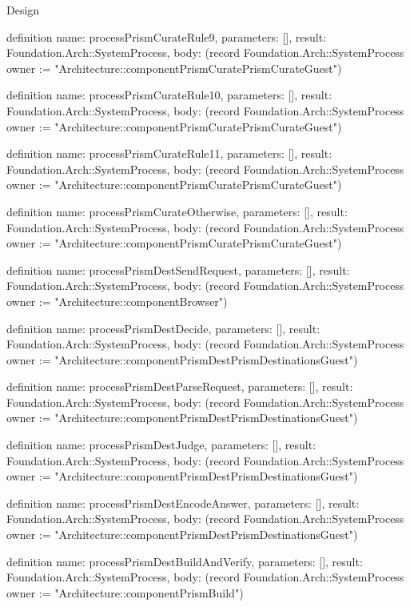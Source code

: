 \begin{lexlean}{Design}
\begin{semanticmodule}
definition{
  name: processPrismCurateRule9,
  parameters: [],
  result: Foundation.Arch::SystemProcess,
  body: (record Foundation.Arch::SystemProcess {owner := "Architecture::componentPrismCuratePrismCurateGuest"})
}

definition{
  name: processPrismCurateRule10,
  parameters: [],
  result: Foundation.Arch::SystemProcess,
  body: (record Foundation.Arch::SystemProcess {owner := "Architecture::componentPrismCuratePrismCurateGuest"})
}

definition{
  name: processPrismCurateRule11,
  parameters: [],
  result: Foundation.Arch::SystemProcess,
  body: (record Foundation.Arch::SystemProcess {owner := "Architecture::componentPrismCuratePrismCurateGuest"})
}

definition{
  name: processPrismCurateOtherwise,
  parameters: [],
  result: Foundation.Arch::SystemProcess,
  body: (record Foundation.Arch::SystemProcess {owner := "Architecture::componentPrismCuratePrismCurateGuest"})
}

definition{
  name: processPrismDestSendRequest,
  parameters: [],
  result: Foundation.Arch::SystemProcess,
  body: (record Foundation.Arch::SystemProcess {owner := "Architecture::componentBrowser"})
}

definition{
  name: processPrismDestDecide,
  parameters: [],
  result: Foundation.Arch::SystemProcess,
  body: (record Foundation.Arch::SystemProcess {owner := "Architecture::componentPrismDestPrismDestinationsGuest"})
}

definition{
  name: processPrismDestParseRequest,
  parameters: [],
  result: Foundation.Arch::SystemProcess,
  body: (record Foundation.Arch::SystemProcess {owner := "Architecture::componentPrismDestPrismDestinationsGuest"})
}

definition{
  name: processPrismDestJudge,
  parameters: [],
  result: Foundation.Arch::SystemProcess,
  body: (record Foundation.Arch::SystemProcess {owner := "Architecture::componentPrismDestPrismDestinationsGuest"})
}

definition{
  name: processPrismDestEncodeAnswer,
  parameters: [],
  result: Foundation.Arch::SystemProcess,
  body: (record Foundation.Arch::SystemProcess {owner := "Architecture::componentPrismDestPrismDestinationsGuest"})
}

definition{
  name: processPrismDestBuildAndVerify,
  parameters: [],
  result: Foundation.Arch::SystemProcess,
  body: (record Foundation.Arch::SystemProcess {owner := "Architecture::componentPrismBuild"})
}


\end{semanticmodule}
\end{lexlean}
